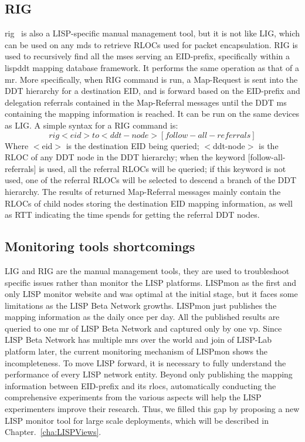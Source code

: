 \subsection{RIG}
\label{subsec:monitor_rig}
\acrfull{rig}~\cite{rfc8112} is also a LISP-specific manual management tool, but it is not like LIG, which can be used on any \acrshort{mds} to retrieve RLOCs used for packet encapsulation. RIG is used to recursively find all the \acrshort{ms}es serving an EID-prefix, specifically within a \acrshort{lispddt} mapping database framework. It performs the same operation as that of a \acrshort{mr}. More specifically, when RIG command is run, a Map-Request is sent into the DDT hierarchy for a destination EID, and is forward based on the EID-prefix and delegation referrals contained in the Map-Referral messages until the DDT \acrshort{ms} containing the mapping information is reached. It can be run on the same devices as LIG. A simple syntax for a RIG command is:
\begin{equation}
rig <eid> to <ddt-node> [follow-all-referrals] \nonumber
\end{equation}
Where $<$eid$>$ is the destination EID being queried; $<$ddt-node$>$ is the RLOC of any DDT node in the DDT hierarchy; when the keyword $[$follow-all-referrals$]$ is used, all the referral RLOCs will be queried; if this keyword is not used, one of the referral RLOCs will be selected to descend a branch of the DDT hierarchy. The results of returned Map-Referral messages mainly contain the RLOCs of child nodes storing the destination EID mapping information, as well as RTT indicating the time spends for getting the referral DDT nodes.

\subsection{Monitoring tools shortcomings}
\label{subsec:monitor_missing}
LIG and RIG are the manual management tools, they are used to troubleshoot specific issues rather than monitor the LISP platforms. LISPmon as the first and only LISP monitor website and was optimal at the initial stage, but it faces some limitations as the LISP Beta Network growths. LISPmon just publishes the mapping information as the daily once per day. All the published results are queried to one \acrshort{mr} of LISP Beta Network and captured only by one \acrshort{vp}. Since LISP Beta Network has multiple \acrshort{mr}s over the world and join of LISP-Lab platform later, the current monitoring mechanism of LISPmon shows the incompleteness. To move LISP forward, it is necessary to fully understand the performance of every LISP network entity. Beyond only publishing the mapping information between EID-prefix and its \acrshort{rloc}s, automatically conducting the comprehensive experiments from the various aspects will help the LISP experimenters improve their research. Thus, we filled this gap by proposing a new LISP monitor tool for large scale deployments, which will be described in Chapter.~\ref{cha:LISPViews}.


